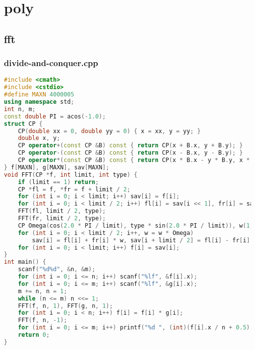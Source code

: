 \documentclass[9pt, a4paper, oneside]{book}
\begin{document}
\section{poly}
\subsection{fft}
\subsubsection{divide-and-conquer.cpp}
\begin{lstlisting}[language={C++}]
#include <cmath>
#include <cstdio>
#define MAXN 4000005
using namespace std;
int n, m;
const double PI = acos(-1.0);
struct CP {
    CP(double xx = 0, double yy = 0) { x = xx, y = yy; }
    double x, y;
    CP operator+(const CP &B) const { return CP(x + B.x, y + B.y); }
    CP operator-(const CP &B) const { return CP(x - B.x, y - B.y); }
    CP operator*(const CP &B) const { return CP(x * B.x - y * B.y, x * B.y + y * B.x); }
} f[MAXN], g[MAXN], sav[MAXN];
void FFT(CP *f, int limit, int type) {
    if (limit == 1) return;
    CP *fl = f, *fr = f + limit / 2;
    for (int i = 0; i < limit; i++) sav[i] = f[i];
    for (int i = 0; i < limit / 2; i++) fl[i] = sav[i << 1], fr[i] = sav[i << 1 | 1];
    FFT(fl, limit / 2, type);
    FFT(fr, limit / 2, type);
    CP Omega(cos(2.0 * PI / limit), type * sin(2.0 * PI / limit)), w(1, 0);
    for (int i = 0; i < limit / 2; i++, w = w * Omega)
        sav[i] = fl[i] + fr[i] * w, sav[i + limit / 2] = fl[i] - fr[i] * w;
    for (int i = 0; i < limit; i++) f[i] = sav[i];
}
int main() {
    scanf("%d%d", &n, &m);
    for (int i = 0; i <= n; i++) scanf("%lf", &f[i].x);
    for (int i = 0; i <= m; i++) scanf("%lf", &g[i].x);
    m += n, n = 1;
    while (n <= m) n <<= 1;
    FFT(f, n, 1), FFT(g, n, 1);
    for (int i = 0; i < n; i++) f[i] = f[i] * g[i];
    FFT(f, n, -1);
    for (int i = 0; i <= m; i++) printf("%d ", (int)(f[i].x / n + 0.5));
    return 0;
}\end{lstlisting}
\end{document}
